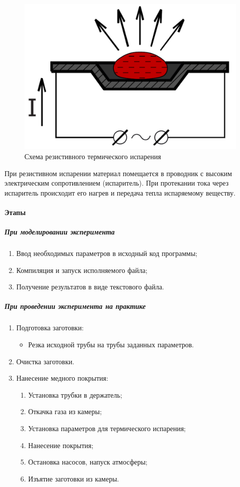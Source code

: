 \documentclass[../../AISTR.tex]{subfiles}
\begin{document}
\begin{figure}[H]
	\centering
	\includegraphics[width=0.5\linewidth]{resistivnoe}
	\caption{Схема резистивного термического испарения}
	\label{fig:resistivnoe}
\end{figure}


При резистивном испарении материал помещается в проводник с высоким электрическим сопротивлением (испаритель). При протекании тока через испаритель происходит его нагрев и передача тепла испаряемому веществу.
\paragraph{Этапы}
\subparagraph{При моделировании эксперимента}
\begin{enumerate}
	\item Ввод необходимых параметров в исходный код программы;
	\item Компиляция и запуск исполняемого файла;
	\item Получение результатов в виде текстового файла.
\end{enumerate}
\subparagraph{При проведении эксперимента на практике}
\begin{enumerate}
	\item Подготовка заготовки:
	\begin{itemize}
		\item Резка исходной трубы на трубы заданных параметров.
	\end{itemize}
	 \item Очистка заготовки.
	 \item Нанесение медного покрытия:
	 \begin{enumerate}
	 	\item Установка трубки в держатель;
	 	\item Откачка газа из камеры;
	 	\item Установка параметров для термического испарения;
	 	\item Нанесение покрытия;
	 	\item Остановка насосов, напуск атмосферы;
	 	\item Изъятие заготовки из камеры.
	 \end{enumerate}
\end{enumerate}
\end{document}
